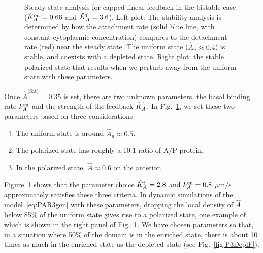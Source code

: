 \documentclass[11pt]{article}
\newcommand{\6}[1]{#1_{\text{6}}}
\newcommand{\3}[1]{#1_{\text{3}}}
\newcommand{\Sat}[1]{#1^\text{(Sat)}}
\begin{document}
\begin{figure}
\centering
{}
\caption{\label{fig:P3Cap}Steady state analysis for capped linear feedback in the bistable case ($\hat{K}^\text{on}_A=0.66$ and $\hat{K}^\text{f}_A=3.6$). Left plot: The stability analysis is determined by how the attachment rate (solid blue line, with constant cytoplasmic concentration) compares to the detachment rate (red) near the steady state. The uniform state ($\hat A_u \approx 0.4$) is stable, and coexists with a depleted state. Right plot: the stable polarized state that results when we perturb away from the uniform state with these parameters.}
\end{figure}

Once $\Sat{\hat A}=0.35$ is set, there are two unknown parameters, the basal binding rate $k^\text{on}_A$ and the strength of the feedback $\hat{K}^\text{f}_A$. In Fig.\ \ref{fig:P3Cap}, we set these two parameters based on three considerations
\begin{enumerate}
\item The uniform state is around $\hat A_u \approx 0.5$.
\item The polarized state has roughly a 10:1 ratio of A/P protein.
\item In the polarized state, $\hat A \approx 0.6$ on the anterior.
\end{enumerate}
Figure\ \ref{fig:P3Cap} shows that the parameter choice $\hat{K}^\text{f}_A=2.8$ and $k^\text{on}_A=0.8$ $\mu$m/s approximately satisfies these three criteria. In dynamic simulations of the model\ \eqref{eq:PAR3gen} with these parameters, dropping the local density of $\hat A$ below 85\% of the uniform state gives rise to a polarized state, one example of which is shown in the right panel of Fig.\ \ref{fig:P3Cap}. We have chosen parameters so that, in a situation where 50\% of the domain is in the enriched state, there is about 10 times as much in the enriched state as the depleted state (see Fig.\ \ref{fig:P3DeplF}).
\end{document}
